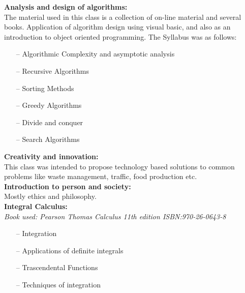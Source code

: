 \documentclass{article}
\begin{document}
\textbf{Analysis and design of algorithms:}\\
    The material used in this class is a collection of on-line material and several books.
    Application of algorithm design using visual basic, and also as an introduction
    to object oriented programming. The Syllabus was as follows:
    \begin{itemize}
     \setlength\itemsep{0pt}
        \item[--] Algorithmic Complexity and asymptotic analysis
        \item[--] Recursive Algorithms
        \item[--] Sorting Methods
        \item[--] Greedy Algorithms
        \item[--] Divide and conquer
        \item[--] Search Algorithms
    \end{itemize}

\textbf{Creativity and innovation:}\\
    This class was intended to propose technology based solutions to common problems
    like waste management, traffic, food production etc.\\


\textbf{Introduction to person and society:}\\
    Mostly ethics and philosophy. \\

\textbf{Integral Calculus:}\\
    \emph{Book used: Pearson Thomas Calculus 11th edition ISBN:970-26-0643-8}
  \begin{itemize}
     \setlength\itemsep{0pt}
      \item[--] Integration
      \item[--] Applications of definite integrals
      \item[--] Trascendental Functions
      \item[--] Techniques of integration
  \end{itemize}
\end{document}

